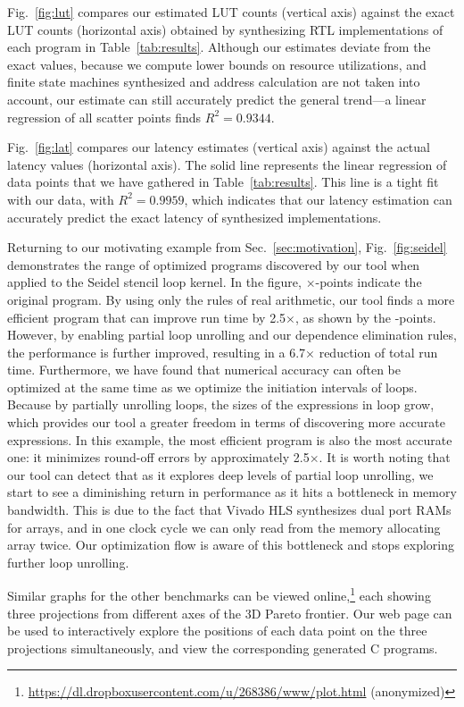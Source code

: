 Fig.~\ref{fig:lut} compares our estimated LUT counts (vertical axis)
against the exact LUT counts (horizontal axis) obtained by synthesizing RTL
implementations of each program in Table~\ref{tab:results}.  Although our
estimates deviate from the exact values, because we compute lower bounds on
resource utilizations, and finite state machines synthesized and address
calculation are not taken into account, our estimate can still accurately
predict the general trend---a linear regression of all scatter points finds
$R^2 = 0.9344$.

Fig.~\ref{fig:lat} compares our latency estimates (vertical axis)
against the actual latency values (horizontal axis). The solid line
represents the linear regression of data points that we have gathered in
Table~\ref{tab:results}. This line is a tight fit with our data, with $R^2 =
0.9959$, which indicates that our latency estimation can accurately predict the
exact latency of synthesized implementations.

Returning to our motivating example from Sec.~\ref{sec:motivation},
Fig.~\ref{fig:seidel} demonstrates the range of optimized programs discovered
by our tool when applied to the Seidel stencil loop kernel. In the figure,
$\times$-points indicate the original program. By using only the rules of
real arithmetic, our tool finds a more efficient program that can improve run
time by 2.5$\times$, as shown by the \redcircle-points. However, by enabling
partial loop unrolling and our dependence elimination rules, the performance
is further improved, resulting in a 6.7$\times$ reduction of total run time.
Furthermore, we have found that numerical accuracy can often be optimized at
the same time as we optimize the initiation intervals of loops. Because by
partially unrolling loops, the sizes of the expressions in loop grow, which
provides our tool a greater freedom in terms of discovering more accurate
expressions. In this example, the most efficient program is also the most
accurate one: it minimizes round-off errors by approximately 2.5$\times$. It
is worth noting that our tool can detect that as it explores deep levels of
partial loop unrolling, we start to see a diminishing return in performance as
it hits a bottleneck in memory bandwidth.  This is due to the fact that Vivado
HLS synthesizes dual port RAMs for arrays, and in one clock cycle we can only
read from the memory allocating array twice.  Our optimization flow is aware of
this bottleneck and stops exploring further loop unrolling.

Similar graphs for the other benchmarks can be viewed
online,\footnote{\url{https://dl.dropboxusercontent.com/u/268386/www/plot.html}
(anonymized)} each showing three projections from different axes of the
3D Pareto frontier. Our web page can be used to interactively explore the
positions of each data point on the three projections simultaneously, and view
the corresponding generated C programs.

